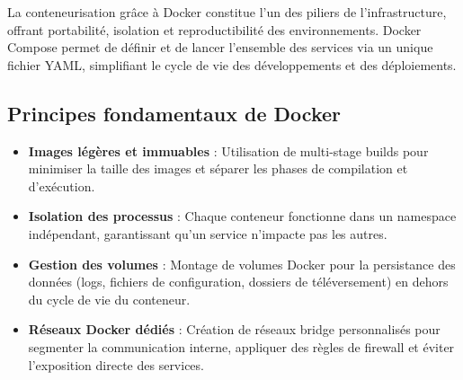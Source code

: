 \documentclass[12pt]{rapportPfe}
\begin{document}
La conteneurisation grâce à Docker constitue l’un des piliers de l’infrastructure, offrant portabilité, isolation et reproductibilité des environnements. Docker Compose permet de définir et de lancer l’ensemble des services via un unique fichier YAML, simplifiant le cycle de vie des développements et des déploiements.

\subsection{Principes fondamentaux de Docker}
\begin{itemize}[itemsep=0.8em]
  \item \textbf{Images légères et immuables} : Utilisation de multi-stage builds pour minimiser la taille des images et séparer les phases de compilation et d’exécution.
  \item \textbf{Isolation des processus} : Chaque conteneur fonctionne dans un namespace indépendant, garantissant qu’un service n’impacte pas les autres.
  \item \textbf{Gestion des volumes} : Montage de volumes Docker pour la persistance des données (logs, fichiers de configuration, dossiers de téléversement) en dehors du cycle de vie du conteneur.
  \item \textbf{Réseaux Docker dédiés} : Création de réseaux bridge personnalisés pour segmenter la communication interne, appliquer des règles de firewall et éviter l’exposition directe des services.
\end{itemize}
\end{document}
